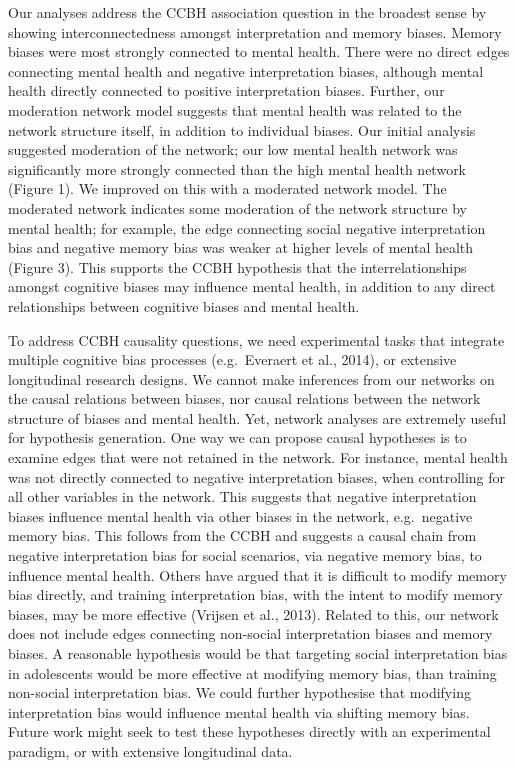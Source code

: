 \documentclass[man,floatsintext]{apa6}
\begin{document}
Our analyses address the CCBH association question in the broadest sense by showing interconnectedness amongst interpretation and memory biases. Memory biases were most strongly connected to mental health. There were no direct edges connecting mental health and negative interpretation biases, although mental health directly connected to positive interpretation biases. Further, our moderation network model suggests that mental health was related to the network structure itself, in addition to individual biases. Our initial analysis suggested moderation of the network; our low mental health network was significantly more strongly connected than the high mental health network (Figure 1). We improved on this with a moderated network model. The moderated network indicates some moderation of the network structure by mental health; for example, the edge connecting social negative interpretation bias and negative memory bias was weaker at higher levels of mental health (Figure 3). This supports the CCBH hypothesis that the interrelationships amongst cognitive biases may influence mental health, in addition to any direct relationships between cognitive biases and mental health.

To address CCBH causality questions, we need experimental tasks that integrate multiple cognitive bias processes (e.g.~Everaert et al., 2014), or extensive longitudinal research designs. We cannot make inferences from our networks on the causal relations between biases, nor causal relations between the network structure of biases and mental health. Yet, network analyses are extremely useful for hypothesis generation. One way we can propose causal hypotheses is to examine edges that were not retained in the network. For instance, mental health was not directly connected to negative interpretation biases, when controlling for all other variables in the network. This suggests that negative interpretation biases influence mental health via other biases in the network, e.g.~negative memory bias. This follows from the CCBH and suggests a causal chain from negative interpretation bias for social scenarios, via negative memory bias, to influence mental health. Others have argued that it is difficult to modify memory bias directly, and training interpretation bias, with the intent to modify memory biases, may be more effective (Vrijsen et al., 2013). Related to this, our network does not include edges connecting non-social interpretation biases and memory biases. A reasonable hypothesis would be that targeting social interpretation bias in adolescents would be more effective at modifying memory bias, than training non-social interpretation bias. We could further hypothesise that modifying interpretation bias would influence mental health via shifting memory bias. Future work might seek to test these hypotheses directly with an experimental paradigm, or with extensive longitudinal data.
\end{document}

